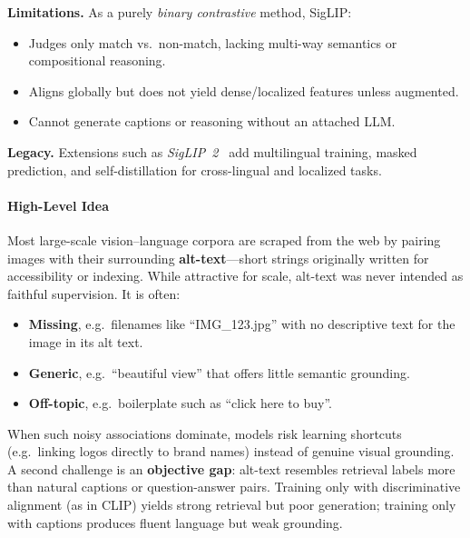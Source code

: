 \begin{enrichment}
\begin{enrichment}
        \textbf{Limitations.} As a purely \emph{binary contrastive} method, SigLIP:
        \begin{itemize}
            \item Judges only match vs.\ non-match, lacking multi-way semantics or compositional reasoning.
            \item Aligns globally but does not yield dense/localized features unless augmented.
            \item Cannot generate captions or reasoning without an attached LLM.
        \end{itemize}
        
        \textbf{Legacy.} Extensions such as \emph{SigLIP~2}~\cite{tschannen2025_siglip2} add multilingual training, masked prediction, and self-distillation for cross-lingual and localized tasks. 
        
    \end{enrichment}
    
    \newpage
    
    \begin{enrichment}
        \label{enr:subsec_chapter24_blip}
        
        \paragraph{High-Level Idea}
        Most large-scale vision--language corpora are scraped from the web by pairing images with their surrounding \textbf{alt-text}---short strings originally written for accessibility or indexing. While attractive for scale, alt-text was never intended as faithful supervision. It is often:
        \begin{itemize}
            \item \textbf{Missing}, e.g.\ filenames like ``IMG\_123.jpg'' with no descriptive text for the image in its alt text.
            \item \textbf{Generic}, e.g.\ ``beautiful view'' that offers little semantic grounding.
            \item \textbf{Off-topic}, e.g.\ boilerplate such as ``click here to buy''.
        \end{itemize}
        When such noisy associations dominate, models risk learning shortcuts (e.g.\ linking logos directly to brand names) instead of genuine visual grounding. A second challenge is an \textbf{objective gap}: alt-text resembles retrieval labels more than natural captions or question-answer pairs. Training only with discriminative alignment (as in CLIP) yields strong retrieval but poor generation; training only with captions produces fluent language but weak grounding.
        

\end{enrichment}
\end{enrichment}
